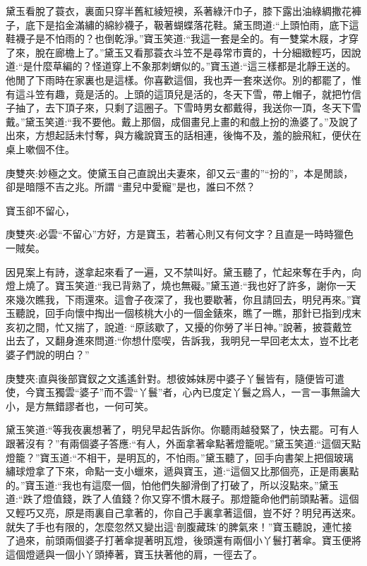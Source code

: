 \begin{parag}
    黛玉看脫了蓑衣，裏面只穿半舊紅綾短襖，系著綠汗巾子，膝下露出油綠綢撒花褲子，底下是掐金滿繡的綿紗襪子，靸著蝴蝶落花鞋。黛玉問道:“上頭怕雨，底下這鞋襪子是不怕雨的？也倒乾淨。”寶玉笑道:“我這一套是全的。有一雙棠木屐，才穿了來，脫在廊檐上了。”黛玉又看那蓑衣斗笠不是尋常市賣的，十分細緻輕巧，因說道:“是什麼草編的？怪道穿上不象那刺蝟似的。”寶玉道:“這三樣都是北靜王送的。他閒了下雨時在家裏也是這樣。你喜歡這個，我也弄一套來送你。別的都罷了，惟有這斗笠有趣，竟是活的。上頭的這頂兒是活的，冬天下雪，帶上帽子，就把竹信子抽了，去下頂子來，只剩了這圈子。下雪時男女都戴得，我送你一頂，冬天下雪戴。”黛玉笑道:“我不要他。戴上那個，成個畫兒上畫的和戲上扮的漁婆了。”及說了出來，方想起話未忖奪，與方纔說寶玉的話相連，後悔不及，羞的臉飛紅，便伏在桌上嗽個不住。\begin{note}庚雙夾:妙極之文。使黛玉自己直說出夫妻來，卻又云“畫的”“扮的”，本是閒談，卻是暗隱不吉之兆。所謂 “畫兒中愛寵”是也，誰曰不然？\end{note}
\end{parag}


\begin{parag}
    寶玉卻不留心，\begin{note}庚雙夾:必雲“不留心”方好，方是寶玉，若著心則又有何文字？且直是一時時獵色一賊矣。\end{note}因見案上有詩，遂拿起來看了一遍，又不禁叫好。黛玉聽了，忙起來奪在手內，向燈上燒了。寶玉笑道:“我已背熟了，燒也無礙。”黛玉道:“我也好了許多，謝你一天來幾次瞧我，下雨還來。這會子夜深了，我也要歇著，你且請回去，明兒再來。”寶玉聽說，回手向懷中掏出一個核桃大小的一個金錶來，瞧了一瞧，那針已指到戌末亥初之間，忙又揣了，說道: “原該歇了，又擾的你勞了半日神。”說著，披蓑戴笠出去了，又翻身進來問道:“你想什麼喫，告訴我，我明兒一早回老太太，豈不比老婆子們說的明白？”\begin{note}庚雙夾:直與後部寶釵之文遙遙針對。想彼姊妹房中婆子丫鬟皆有，隨便皆可遣使，今寶玉獨雲“婆子”而不雲“丫鬟”者，心內已度定丫鬟之爲人，一言一事無論大小，是方無錯謬者也，一何可笑。\end{note}黛玉笑道:“等我夜裏想著了，明兒早起告訴你。你聽雨越發緊了，快去罷。可有人跟著沒有？”有兩個婆子答應:“有人，外面拿著傘點著燈籠呢。”黛玉笑道:“這個天點燈籠？”寶玉道:“不相干，是明瓦的，不怕雨。”黛玉聽了，回手向書架上把個玻璃繡球燈拿了下來，命點一支小蠟來，遞與寶玉，道:“這個又比那個亮，正是雨裏點的。”寶玉道:“我也有這麼一個，怕他們失腳滑倒了打破了，所以沒點來。”黛玉道:“跌了燈值錢，跌了人值錢？你又穿不慣木屐子。那燈籠命他們前頭點著。這個又輕巧又亮，原是雨裏自己拿著的，你自己手裏拿著這個，豈不好？明兒再送來。就失了手也有限的，怎麼忽然又變出這‘剖腹藏珠’的脾氣來！”寶玉聽說，連忙接了過來，前頭兩個婆子打著傘提著明瓦燈，後頭還有兩個小丫鬟打著傘。寶玉便將這個燈遞與一個小丫頭捧著，寶玉扶著他的肩，一徑去了。
\end{parag}


